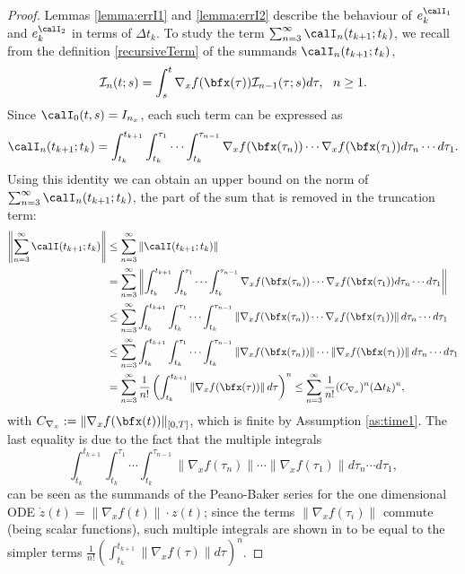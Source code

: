 \documentclass[DIV=12]{scrartcl} %
\newcommand{\err}{\ensuremath{e}}
\theoremstyle{definition}
\begin{document}
\begin{proof}
Lemmas \ref{lemma:errI1} and \ref{lemma:errI2} describe the behaviour of $\err_k^{\calI_1}$ and $\err_k^{\calI_2}$ in terms of $\Delta t_k$. To study the term $\sum_{n=3}^\infty\calI_n(t_{k+1};t_k)$, we recall from the definition \eqref{recursiveTerm} of the summands $\calI_n(t_{k+1};t_k)$, 
\[ 
\mathcal{I}_{n}(t;s) = \int_{s}^t \nabla_xf(\bfx(\tau))\mathcal{I}_{n-1}(\tau;s)d\tau, \ \ n \geq 1.
\]
Since $\calI_0(t,s)=I_{n_x}$, each such term can be expressed as
\[
\calI_n(t_{k+1};t_k) = \int_{t_k}^{t_{k+1}}\int_{t_k}^{\tau_1}\cdots\int_{t_k}^{\tau_{n-1}}\nabla_xf(\bfx(\tau_{n}))\cdots \nabla_xf(\bfx(\tau_1)) d\tau_{n}\cdots d\tau_1.
\]
Using this identity we can obtain an upper bound on the norm of $\sum_{n=3}^\infty\calI_n(t_{k+1};t_k)$, the part of the sum that is removed in the truncation term: 
\begin{equation}
    \label{majorationNormPBS}
    \begin{aligned}
    \left\|  \sum_{n=3}^\infty\calI(t_{k+1};t_k)\right\| &\le \sum_{n=3}^\infty\left\|\calI(t_{k+1};t_k) \right\| \\
    &=\sum_{n=3}^\infty\left\|\int_{t_k}^{t_{k+1}}\int_{t_k}^{\tau_1}\cdots\int_{t_k}^{\tau_{n-1}}\nabla_xf(\bfx(\tau_{n}))\cdots \nabla_xf(\bfx(\tau_1)) d\tau_{n}\cdots d\tau_1 \right\| \\
    &\le \sum_{n=3}^\infty\int_{t_k}^{t_{k+1}}\int_{t_k}^{\tau_1}\cdots\int_{t_k}^{\tau_{n-1}}\left\|\nabla_xf(\bfx(\tau_{n}))\cdots \nabla_xf(\bfx(\tau_1))\right\| d\tau_{n}\cdots d\tau_1 \\
    &\le \sum_{n=3}^\infty\int_{t_k}^{t_{k+1}}\int_{t_k}^{\tau_1}\cdots\int_{t_k}^{\tau_{n-1}}\left\|\nabla_xf(\bfx(\tau_{n}))\right\|\cdots \left\|\nabla_xf(\bfx(\tau_1))\right\| d\tau_{n}\cdots d\tau_1 \\
    &=\sum_{n=3}^\infty\frac{1}{n!} \left(\int_{t_k}^{t_{k+1}}\left\|\nabla_xf(\bfx(\tau))\right\|d\tau\right)^n\le\sum_{n=3}^\infty\frac{1}{n!} (C_{\nabla_x})^n(\Delta t_k)^n,
\end{aligned}
\end{equation}
with $C_{\nabla_x}:=\|\nabla_xf(\bfx(t))\|_{[0,T]}$, which is finite by Assumption \ref{as:time1}. The last equality is due to the fact that the multiple integrals 
\[ 
\int_{t_k}^{t_{k+1}}\int_{t_k}^{\tau_1}\cdots\int_{t_k}^{\tau_{n-1}}\left\|\nabla_xf(\tau_{n})\right\|\cdots \left\|\nabla_xf(\tau_1)\right\| d\tau_{n}\cdots d\tau_1,
\]
can be seen as the summands of the Peano-Baker series for the one dimensional ODE $\dot{z}(t)=\|\nabla_xf(t)\|\cdot z(t)$; since the terms $\|\nabla_xf(\tau_i)\|$ commute (being scalar functions), such multiple integrals are shown in \cite{PeanoBaker} to be equal to the simpler terms $\frac{1}{n!} \left(\int_{t_k}^{t_{k+1}}\left\|\nabla_xf(\tau)\right\|d\tau\right)^n$.


\end{proof}
\end{document}
